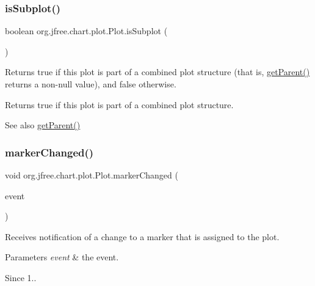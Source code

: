 \subsubsection{\texorpdfstring{is\+Subplot()}{isSubplot()}}
{\footnotesize\ttfamily boolean org.\+jfree.\+chart.\+plot.\+Plot.\+is\+Subplot (\begin{DoxyParamCaption}{ }\end{DoxyParamCaption})}

Returns {\ttfamily true} if this plot is part of a combined plot structure (that is, \mbox{\hyperlink{classorg_1_1jfree_1_1chart_1_1plot_1_1_plot_a7dd8b47d0a7ec2a24291ee9e29c9a9ba}{get\+Parent()}} returns a non-\/{\ttfamily null} value), and {\ttfamily false} otherwise.

\begin{DoxyReturn}{Returns}
{\ttfamily true} if this plot is part of a combined plot structure.
\end{DoxyReturn}
\begin{DoxySeeAlso}{See also}
\mbox{\hyperlink{classorg_1_1jfree_1_1chart_1_1plot_1_1_plot_a7dd8b47d0a7ec2a24291ee9e29c9a9ba}{get\+Parent()}} 
\end{DoxySeeAlso}
\mbox{\label{classorg_1_1jfree_1_1chart_1_1plot_1_1_plot_ae13294cb202d066c55a18ec96b7b7622}} 
\subsubsection{\texorpdfstring{marker\+Changed()}{markerChanged()}}
{\footnotesize\ttfamily void org.\+jfree.\+chart.\+plot.\+Plot.\+marker\+Changed (\begin{DoxyParamCaption}\item[{\mbox{\hyperlink{classorg_1_1jfree_1_1chart_1_1event_1_1_marker_change_event}{Marker\+Change\+Event}}}]{event }\end{DoxyParamCaption})}

Receives notification of a change to a marker that is assigned to the plot.


\begin{DoxyParams}{Parameters}
{\em event} & the event.\\
\hline
\end{DoxyParams}
\begin{DoxySince}{Since}
1.. 
\end{DoxySince}


